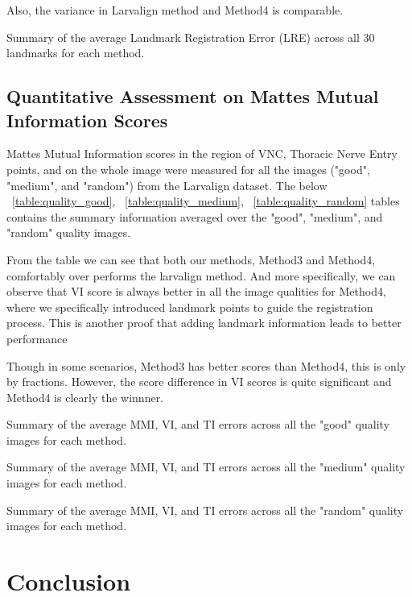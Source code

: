 \documentclass{report}
\begin{document}
	Also, the variance in Larvalign method and Method4 is comparable.
	
	\begin{table}[h]
		\centering
		
		\caption{Summary of the average Landmark Registration Error (LRE) across all 30 landmarks for each method.}
		\label{table:lre}
	\end{table}

	\section{Quantitative Assessment on Mattes Mutual Information Scores}
	Mattes Mutual Information scores in the region of VNC, Thoracic Nerve Entry points, and on the whole image were measured for all the images ("good", "medium", and "random") from the Larvalign dataset. The below ~\ref{table:quality_good}, ~\ref{table:quality_medium}, ~\ref{table:quality_random} tables contains the summary information averaged over the "good", "medium", and "random" quality images.
	
	From the table we can see that both our methods, Method3 and Method4, comfortably over performs the larvalign method. And more specifically, we can observe that VI score is always better in all the image qualities for Method4, where we specifically introduced landmark points to guide the registration process. This is another proof that adding landmark information leads to better performance
	
	Though in some scenarios, Method3 has better scores than Method4, this is only by fractions. However, the score difference in VI scores is quite significant and Method4 is clearly the winnner.
	
	\begin{table}[h!]
		\centering
		
		\caption{Summary of the average MMI, VI, and TI errors across all the "good" quality images for each method.}
		\label{table:quality_good}
	\end{table}
	
	\begin{table}[h!]
		\centering
		
		\caption{Summary of the average MMI, VI, and TI errors across all the "medium" quality images for each method.}
		\label{table:quality_medium}
	\end{table}
	
	\begin{table}[h]
		\centering
		
		\caption{Summary of the average MMI, VI, and TI errors across all the "random" quality images for each method.}
		\label{table:quality_random}
	\end{table}
	
	\chapter{Conclusion}
	
	\newpage
	\listoffigures
	\listoftables
	\lstlistoflistings %
	
	
	
\end{document}
